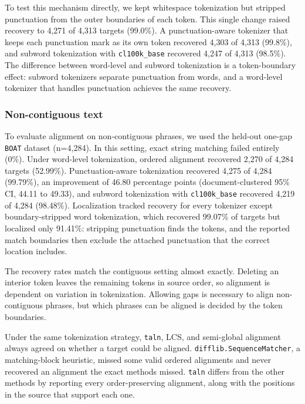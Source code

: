 \documentclass[pdflatex,lineno,referee,sn-vancouver-num]{sn-jnl}
\theoremstyle{thmstyleone}
\theoremstyle{thmstylethree}
\theoremstyle{thmstyletwo}
\begin{document}
To test this mechanism directly, we kept whitespace tokenization but stripped punctuation from the outer boundaries of each token. This single change raised recovery to 4,271 of 4,313 targets (99.0\%). A punctuation-aware tokenizer that keeps each punctuation mark as its own token recovered 4,303 of 4,313 (99.8\%), and subword tokenization with \texttt{cl100k\_base} recovered 4,247 of 4,313 (98.5\%). The difference between word-level and subword tokenization is a token-boundary effect: subword tokenizers separate punctuation from words, and a word-level tokenizer that handles punctuation achieves the same recovery.

\subsubsection{Non-contiguous text}
To evaluate alignment on non-contiguous phrases, we used the held-out one-gap \texttt{BOAT} dataset (n=4,284). In this setting, exact string matching failed entirely (0\%). Under word-level tokenization, ordered alignment recovered 2,270 of 4,284 targets (52.99\%). Punctuation-aware tokenization recovered 4,275 of 4,284 (99.79\%), an improvement of 46.80 percentage points (document-clustered 95\% CI, 44.11 to 49.33), and subword tokenization with \texttt{cl100k\_base} recovered 4,219 of 4,284 (98.48\%). Localization tracked recovery for every tokenizer except boundary-stripped word tokenization, which recovered 99.07\% of targets but localized only 91.41\%: stripping punctuation finds the tokens, and the reported match boundaries then exclude the attached punctuation that the correct location includes.

The recovery rates match the contiguous setting almost exactly. Deleting an interior token leaves the remaining tokens in source order, so alignment is dependent on variation in tokenization. Allowing gaps is necessary to align non-contiguous phrases, but which phrases can be aligned is decided by the token boundaries.

Under the same tokenization strategy, \texttt{taln}, LCS, and semi-global alignment always agreed on whether a target could be aligned. \texttt{difflib.SequenceMatcher}, a matching-block heuristic, missed some valid ordered alignments and never recovered an alignment the exact methods missed. \texttt{taln} differs from the other methods by reporting every order-preserving alignment, along with the positions in the source that support each one.
\end{document}

